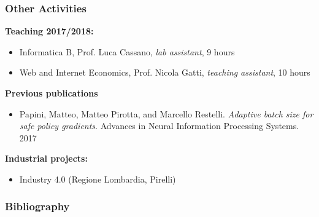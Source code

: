 \documentclass{beamer}
\begin{document}
\begin{frame}
\frametitle{Other Activities}
\textbf{Teaching 2017/2018:}
\begin{itemize}
	\item Informatica B, Prof. Luca Cassano, \textit{lab assistant}, 9 hours
	\item Web and Internet Economics, Prof. Nicola Gatti, \textit{teaching assistant}, 10 hours
\end{itemize}

\vfill

\textbf{Previous publications}
\begin{itemize}
	\item Papini, Matteo, Matteo Pirotta, and Marcello Restelli. \textit{Adaptive batch size for safe policy gradients}. Advances in Neural Information Processing Systems. 2017
\end{itemize}

\vfill

\textbf{Industrial projects:}
\begin{itemize}
	\item Industry 4.0 (Regione Lombardia, Pirelli)
\end{itemize}
\end{frame}


\begin{frame}[allowframebreaks]
\frametitle{Bibliography}



\end{frame}

\end{document}
